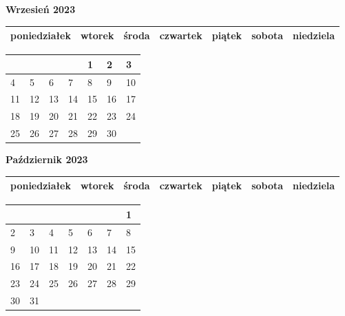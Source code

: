 \clearpage

\begin{landscape}
    \begin{center}
        \textbf{\huge{Wrzesień 2023}}
    \end{center}

    \vspace{-3mm}

    \thispagestyle{empty}
    \noindent
    \begin{tabularx}{28.7cm}{|Y|Y|Y|Y|Y|Y|Y|}
        \hline
poniedziałek & wtorek & środa & czwartek & piątek & sobota & niedziela \\ [-0.5mm]
        \hline
    \end{tabularx}

    \vspace{-0.5mm}

    \noindent
    \begin{tabularx}{28.7cm}{|X|X|X|X|X|X|X|}
        \hline
& & & & 1 & 2 & 3 \\ [31.0mm]
\hline
4 & 5 & 6 & 7 & 8 & 9 & 10 \\ [31.0mm]
\hline
11 & 12 & 13 & 14 & 15 & 16 & 17 \\ [31.0mm]
\hline
18 & 19 & 20 & 21 & 22 & 23 & 24 \\ [31.0mm]
\hline
25 & 26 & 27 & 28 & 29 & 30 & \\ [31.0mm]
\hline

    \end{tabularx}
\end{landscape}

\clearpage

\begin{landscape}
    \begin{center}
        \textbf{\huge{Październik 2023}}
    \end{center}

    \vspace{-3mm}

    \thispagestyle{empty}
    \noindent
    \begin{tabularx}{28.7cm}{|Y|Y|Y|Y|Y|Y|Y|}
        \hline
poniedziałek & wtorek & środa & czwartek & piątek & sobota & niedziela \\ [-0.5mm]
        \hline
    \end{tabularx}

    \vspace{-0.5mm}

    \noindent
    \begin{tabularx}{28.7cm}{|X|X|X|X|X|X|X|}
        \hline
& & & & & & 1 \\ [25.0mm]
\hline
2 & 3 & 4 & 5 & 6 & 7 & 8 \\ [25.0mm]
\hline
9 & 10 & 11 & 12 & 13 & 14 & 15 \\ [25.0mm]
\hline
16 & 17 & 18 & 19 & 20 & 21 & 22 \\ [25.0mm]
\hline
23 & 24 & 25 & 26 & 27 & 28 & 29 \\ [25.0mm]
\hline
30 & 31 & & & & & \\ [25.0mm]
\hline

    \end{tabularx}
\end{landscape}


